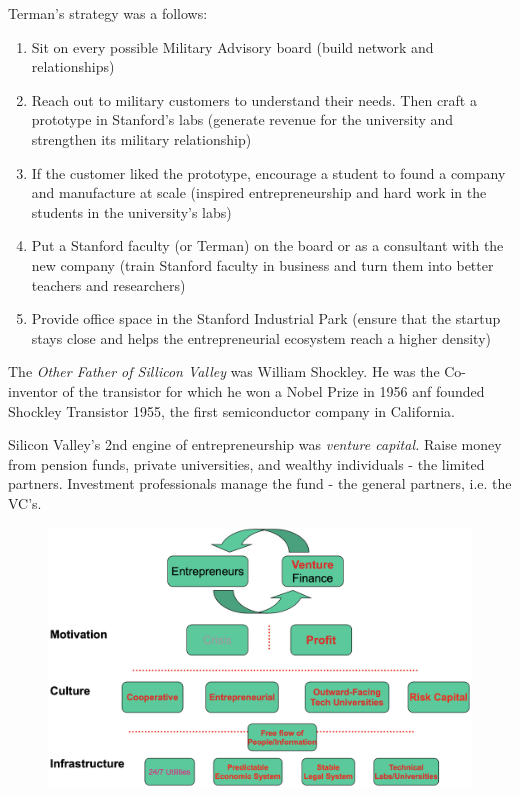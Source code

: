 \documentclass[a4paper]{extarticle}
\begin{document}
Terman's strategy was a follows:

\begin{enumerate}
    \item Sit on every possible Military Advisory board (build network and relationships)
    \item Reach out to military customers to understand their needs. Then craft a prototype in Stanford's labs (generate revenue for the university and strengthen its military relationship)
    \item If the customer liked the prototype, encourage a student to found a company and manufacture at scale (inspired entrepreneurship and hard work in the students in the university's labs)
    \item Put a Stanford faculty (or Terman) on the board or as a consultant with the new company (train Stanford faculty in business and turn them into better teachers and researchers)
    \item Provide office space in the Stanford Industrial Park (ensure that the startup stays close and helps the entrepreneurial ecosystem reach a higher density)
\end{enumerate}

The \textit{Other Father of Sillicon Valley} was William Shockley. He was the Co-inventor of the transistor for which he won a Nobel Prize in 1956 anf founded Shockley Transistor 1955, the first semiconductor company in California.

Silicon Valley's 2nd engine of entrepreneurship was \textit{venture capital.} Raise money from pension funds, private universities, and wealthy individuals - the limited partners. Investment professionals manage the fund - the general partners, i.e. the VC's.

\begin{figure}[H]
    \includegraphics[width=15cm]{../images/EnpRisk_Fig13-2}
    \centering
\end{figure}
\end{document}
